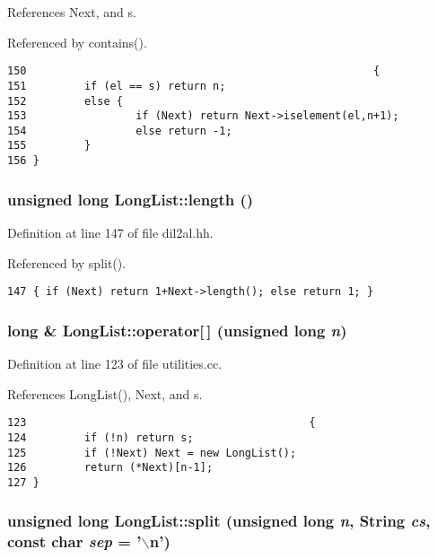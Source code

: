 References Next, and s.

Referenced by contains().



\footnotesize\begin{verbatim}150                                                      {
151         if (el == s) return n;
152         else {
153                 if (Next) return Next->iselement(el,n+1);
154                 else return -1;
155         }
156 }
\end{verbatim}\normalsize 
{}
\subsubsection{\setlength{\rightskip}{0pt plus 5cm}unsigned long Long\-List::length ()\hspace{0.3cm}{\tt  [inline]}}\label{classLongList_a9}




Definition at line 147 of file dil2al.hh.

Referenced by split().



\footnotesize\begin{verbatim}147 { if (Next) return 1+Next->length(); else return 1; }
\end{verbatim}\normalsize 
{}
\subsubsection{\setlength{\rightskip}{0pt plus 5cm}long \& Long\-List::operator[$\,$] (unsigned long {\em n})}\label{classLongList_a5}




Definition at line 123 of file utilities.cc.

References Long\-List(), Next, and s.



\footnotesize\begin{verbatim}123                                            {
124         if (!n) return s;
125         if (!Next) Next = new LongList();
126         return (*Next)[n-1];
127 }
\end{verbatim}\normalsize 
{}
\subsubsection{\setlength{\rightskip}{0pt plus 5cm}unsigned long Long\-List::split (unsigned long {\em n}, {\bf String} {\em cs}, const char {\em sep} = '$\backslash$n')}\label{classLongList_a12}




